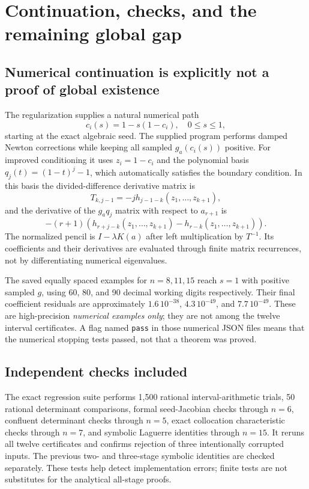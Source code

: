\documentclass[11pt]{article}
\theoremstyle{remark}\newtheorem{remark}[theorem]{Remark}
\begin{document}
\section{Continuation, checks, and the remaining global gap}\label{sec:gap}
\subsection{Numerical continuation is explicitly not a proof of global existence}
The regularization supplies a natural numerical path
\[
 c_i(s)=1-s(1-c_i),\quad0\le s\le1,
\]
starting at the exact algebraic seed. The supplied program performs damped
Newton corrections while keeping all sampled $g_a(c_i(s))$ positive.
For improved conditioning it uses $z_i=1-c_i$ and the polynomial basis
$q_j(t)=(1-t)^j-1$, which automatically satisfies the boundary condition.
In this basis the divided-difference derivative matrix is
\[
 T_{k,j-1}=-j h_{j-1-k}(z_1,\ldots,z_{k+1}),
\]
and the derivative of the $g_aq_j$ matrix with respect to $a_{r+1}$ is
\[
 -(r+1)\left(h_{r+j-k}(z_1,\ldots,z_{k+1})
                     -h_{r-k}(z_1,\ldots,z_{k+1})\right).
\]
The normalized pencil is $I-\lambda K(a)$ after left multiplication by
$T^{-1}$. Its coefficients and their derivatives are evaluated through
finite matrix recurrences, not by differentiating numerical eigenvalues.

The saved equally spaced examples for $n=8,11,15$ reach $s=1$ with positive
sampled $g$, using 60, 80, and 90 decimal working digits respectively.
Their final coefficient residuals are approximately $1.6\,10^{-38}$,
$4.3\,10^{-49}$, and $7.7\,10^{-49}$. These are high-precision
\emph{numerical examples only}; they are not among the twelve interval
certificates. A flag named \texttt{pass} in those numerical JSON files means
that the numerical stopping tests passed, not that a theorem was proved.

\subsection{Independent checks included}
The exact regression suite performs 1,500 rational interval-arithmetic trials,
50 rational determinant comparisons, formal seed-Jacobian checks through
$n=6$, confluent determinant checks through $n=5$, exact collocation
characteristic checks through $n=7$, and symbolic Laguerre identities through
$n=15$. It reruns all twelve certificates and confirms rejection of three
intentionally corrupted inputs. The previous two- and three-stage symbolic
identities are checked separately. These tests help detect implementation
errors; finite tests are not substitutes for the analytical all-stage proofs.
\end{document}
